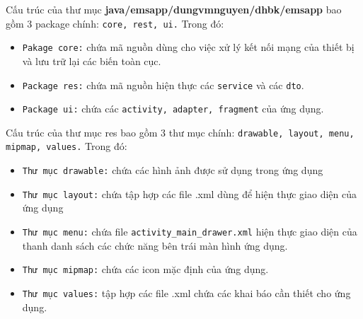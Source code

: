 \documentclass[a4paper]{article}
\begin{document}
Cấu trúc của thư mục \textbf{java/emsapp/dungvmnguyen/dhbk/emsapp} bao gồm 3 package chính: \texttt{core, rest, ui.} Trong đó:
\begin{itemize}
\item \texttt{Pakage core:} chứa mã nguồn dùng cho việc xử lý kết nối mạng của thiết bị và lưu trữ lại các biến toàn cục.
\item \texttt{Package res:} chứa mã nguồn hiện thực các \texttt{service} và các \texttt{dto}.
\item \texttt{Package ui:} chứa các \texttt{activity, adapter, fragment} của ứng dụng.
\end{itemize}
Cấu trúc của thư mục res bao gồm 3 thư mục chính: \texttt{drawable, layout, menu, mipmap, values.} Trong đó:
\begin{itemize}
\item \texttt{Thư mục drawable:} chứa các hình ảnh được sử dụng trong ứng dụng
\item \texttt{Thư mục layout:} chứa tập hợp các file .xml dùng để hiện thực giao diện của ứng dụng
\item \texttt{Thư mục menu:} chứa file \texttt{activity\_main\_drawer.xml} hiện thực giao diện của thanh danh sách các chức năng bên trái màn hình ứng dụng.
\item \texttt{Thư mục mipmap:} chứa các icon mặc định của ứng dụng.
\item \texttt{Thư mục values:} tập hợp các file .xml chứa các khai báo cần thiết cho ứng dụng.
\end{itemize}
\clearpage
\end{document}

